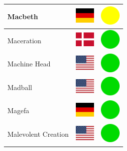\documentclass[12pt, a4paper, twoside]{report}
\begin{document}
\begin{center}
\begin{longtable}{|p{5cm}|p{2cm}|p{2cm}|}
 Macbeth                                                    & \includegraphics[width=1cm]{../img/flags/de} &   \includegraphics[width=1cm]{../likes/m} \\ \hline
 Maceration                                                 & \includegraphics[width=1cm]{../img/flags/dk} &   \includegraphics[width=1cm]{../likes/y} \\ \hline
 Machine Head                                               & \includegraphics[width=1cm]{../img/flags/us} &   \includegraphics[width=1cm]{../likes/y} \\ \hline
 Madball                                                    & \includegraphics[width=1cm]{../img/flags/us} &   \includegraphics[width=1cm]{../likes/y} \\ \hline
 Magefa                                                     & \includegraphics[width=1cm]{../img/flags/de} &   \includegraphics[width=1cm]{../likes/y} \\ \hline
 Malevolent Creation                                        & \includegraphics[width=1cm]{../img/flags/us} &   \includegraphics[width=1cm]{../likes/y} \\ \hline

\end{longtable}
\end{center}
\end{document}
